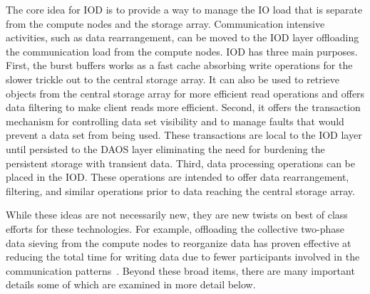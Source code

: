 \documentclass[conference]{IEEEtran}
\begin{document}
The core idea for IOD is to provide a way to manage the IO load that is
separate from the compute nodes and the storage array. Communication intensive
activities, such as data rearrangement, can be moved to the IOD layer
offloading the communication load from the compute nodes. IOD has three main
purposes. First, the burst buffers works as a fast cache absorbing write
operations for the slower trickle out to the central storage array. It can also
be used to retrieve objects from the central storage array for more efficient
read operations and offers data filtering to make client reads more efficient.
Second, it offers the transaction mechanism for controlling data set visibility
and to manage faults that would prevent a data set from being used. These
transactions are local to the IOD layer until persisted to the DAOS layer
eliminating the need for burdening the persistent storage with transient data.
Third, data processing operations can be placed in the IOD. These operations
are intended to offer data rearrangement, filtering, and similar operations
prior to data reaching the central storage array.

While these ideas are not necessarily new, they are new twists on best of class
efforts for these technologies. For example, offloading the collective
two-phase data sieving from the compute nodes to reorganize data has proven
effective at reducing the total time for writing data due to fewer participants
involved in the communication patterns~\cite{lofstead:2011:nessie-staging}.
Beyond these broad items, there are many important details some of which are
examined in more detail below.

%
%
%
%
\end{document}

